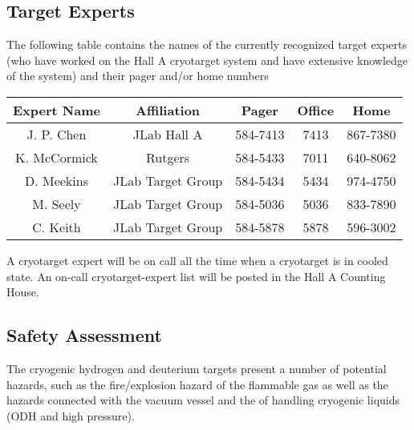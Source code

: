 \begin{safetyen}{10}{10}
\section{Target Experts}
\end{safetyen}

The following table contains the names of the currently recognized target 
experts (who have worked on the Hall A cryotarget system and
have extensive knowledge of the system)
and their pager and/or home numbers

\vspace{0.3cm}
\begin{center}
\begin{tabular}{|c|c|c|c|c|}
\hline 
Expert Name &Affiliation&
Pager&Office&
Home\\
\hline 
\hline 
\hline 
J. P. Chen&JLab Hall A&
 584-7413&
 7413&
 867-7380\\
\hline 
K. McCormick&Rutgers&
584-5433&
7011&
640-8062\\
\hline 
D. Meekins&JLab Target Group&
584-5434&
5434&
974-4750\\
\hline
M. Seely&JLab Target Group&
584-5036&
5036&
833-7890\\
\hline  
C. Keith&JLab Target Group&
584-5878&
5878&
596-3002\\
\hline 
\end{tabular}
\end{center}
\vspace{0.3cm}

\par
A cryotarget expert will be on call all the time when
a cryotarget is in cooled state.
An on-call cryotarget-expert list will be posted in the 
Hall A Counting House. 



\begin{safetyen}{10}{5}
\section{Safety Assessment}
\label{sec:target-cryo-safety}

The cryogenic hydrogen and deuterium targets present a number of potential
hazards, such as the
fire/explosion hazard of the flammable gas as well as the hazards
connected with
the vacuum vessel and the of handling cryogenic liquids
(ODH and high pressure). 
\end{safetyen}

